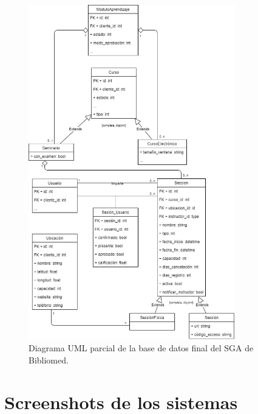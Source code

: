 \begin{figure}[t]
	\begin{center}
		\includegraphics[width=0.8\textwidth]{figuras/databaseBibliomed.jpg}
		\caption{Diagrama UML parcial de la base de datos final del SGA de Bibliomed.} \label{fig:baseDeDatosBibliomed}
		
	\end{center}
\end{figure}

\chapter{Screenshots de los sistemas}


